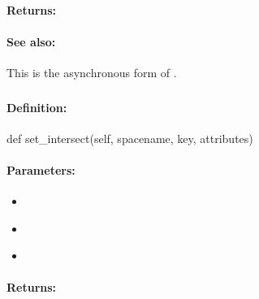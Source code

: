\paragraph{Returns:}


\paragraph{See also:}  This is the asynchronous form of .

\pagebreak
\subsubsection{}
\label{api:python:set_intersect}


\paragraph{Definition:}
\begin{pythoncode}
def set_intersect(self, spacename, key, attributes)
\end{pythoncode}

\paragraph{Parameters:}
\begin{itemize}[noitemsep]
\item {}\\

\item {}\\

\item {}\\

\end{itemize}

\paragraph{Returns:}


\pagebreak
\subsubsection{}
\label{api:python:async_set_intersect}


